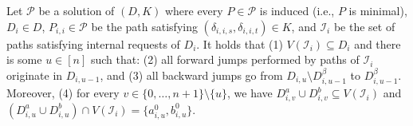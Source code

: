 \documentclass[a4paper,UKenglish,cleveref, autoref, thm-restate]{lipics-v2021}
\begin{document}
    \begin{lemma}
      \label{lem:slivkins_ab_hole}
      Let $\mathcal{P}$ be a solution of $(D, K)$ where every $P \in \mathcal{P}$ is
      induced (i.e., $P$ is minimal), $D_{i} \in D$, $P_{i,i}
      \in \mathcal{P}$ be the path satisfying $(\delta_{i,i,s}, \delta_{i,i,t}) \in K$,
      and $\mathcal{I}_i$ be the set of paths satisfying internal requests of $D_i$.
      It holds that (1) $V(\mathcal{I}_i) \subseteq D_i$ and there is some $u \in [n]$
      such that: (2) all forward jumps performed by paths
      of $\mathcal{I}_i$ originate in $D_{i, u-1}$, and (3) all backward jumps go from
      $D_{i,u} \setminus D^\beta_{i,u-1}$ to $D^\beta_{i,u-1}$.
      Moreover, (4) for every $v \in \{0, \dots, n+1\} \setminus \{u\}$, we have
      $D^a_{i,v} \cup D^b_{i,v} \subseteq V(\mathcal{I}_i)$ and $(D^a_{i,u} \cup
      D^b_{i,u}) \cap V(\mathcal{I}_i) = \{a^0_{i,u}, b^0_{i,u}\}$.
    \end{lemma}
\end{document}

